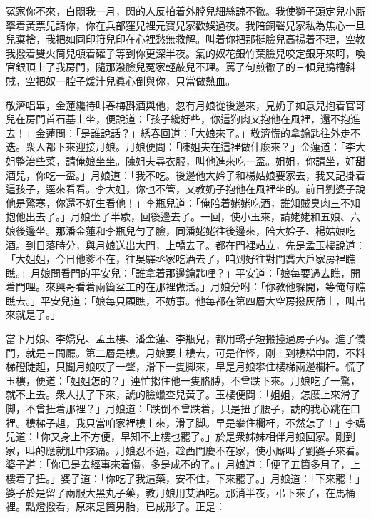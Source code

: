 \begin{myquote} 
冤家你不來，白悶我一月，閃的人反拍着外膛兒細絲諒不徹。我使獅子頭定兒小厮拏着黃票兒請你，你在兵部窪兒裡元寶兒家歡娛過夜。我陪銅磬兒家私為焦心一旦兒棄捨，我把如同印箝兒印在心裡愁無救解。叫着你把那挺臉兒高揚着不理，空教我撥着雙火筒兒頓着礶子等到你更深半夜。氣的奴花銀竹葉臉兒咬定銀牙來呵，喚官銀頂上了我房門，隨那潑臉兒冤家輕敲兒不理。罵了句煎徹了的三傾兒搗槽斜賊，空把奴一腔子煖汁兒眞心倒與你，只當做熱血。
\end{myquote} 

敬濟唱畢，金蓮纔待叫春梅斟酒與他，忽有月娘從後邊來，見奶子如意兒抱着官哥兒在房門首石基上坐，便說道：「孩子纔好些，你這狗肉又抱他在風裡，還不抱進去！」金蓮問：「是誰說話？」綉春回道：「大娘來了。」敬濟慌的拿鑰匙往外走不迭。衆人都下來迎接月娘。月娘便問：「陳姐夫在這裡做什麼來？」金蓮道：「李大姐整治些菜，請俺娘坐坐。{}陳姐夫尋衣服，叫他進來吃一盃。姐姐，你請坐，好甜酒兒，你吃一盃。」月娘道：「我不吃。後邊他大妗子和楊姑娘要家去，我又記掛着這孩子，逕來看看。李大姐，你也不管，又教奶子抱他在風裡坐的。前日劉婆子說他是驚寒，你還不好生看他！」李瓶兒道：「俺陪着姥姥吃酒，誰知賊臭肉三不知抱他出去了。」月娘坐了半歇，回後邊去了。一回，使小玉來，請姥姥和五娘、六娘後邊坐。那潘金蓮和李瓶兒勻了臉，同潘姥姥往後邊來，陪大妗子、楊姑娘吃酒。到日落時分，與月娘送出大門，上轎去了。都在門裡站立，先是孟玉樓說道：「大姐姐，今日他爹不在，往吳驛丞家吃酒去了，咱到好往對門喬大戶家房裡瞧瞧。」月娘問看門的平安兒：「誰拿着那邊鑰匙哩？」平安道：「娘每要過去瞧，開着門哩。來興哥看着兩箇坌工的在那裡做活。」月娘分咐：「你教他躲開，等俺每瞧瞧去。」平安兒道：「娘每只顧瞧，不妨事。他每都在第四層大空房撥灰篩土，叫出來就是了。」

當下月娘、李嬌兒、孟玉樓、潘金蓮、李瓶兒，都用轎子短搬擡過房子內。進了儀門，就是三間廳。第二層是樓。月娘要上樓去，可是作怪，剛上到樓梯中間，不料梯磴陡趄，只聞月娘哎了一聲，滑下一隻脚來，早是月娘攀住樓梯兩邊欄杆。慌了玉樓，便道：「姐姐怎的？」連忙搊住他一隻胳膊，不曾跌下來。月娘吃了一驚，就不上去。衆人扶了下來，諕的臉蠟查兒黃了。玉樓便問：「姐姐，怎麼上來滑了脚，不曾扭着那裡？」月娘道：「跌倒不曾跌着，只是扭了腰子，諕的我心跳在口裡。樓梯子趄，我只當咱家裡樓上來，滑了脚。早是攀住欄杆，不然怎了！」李嬌兒道：「你又身上不方便，早知不上樓也罷了。」於是衆姊妹相伴月娘回家。剛到家，叫的應就肚中疼痛。月娘忍不過，趁西門慶不在家，使小厮叫了劉婆子來看。婆子道：「你已是去經事來着傷，多是成不的了。」月娘道：「便了五箇多月了，上樓着了扭。」婆子道：「你吃了我這藥，安不住，下來罷了。」{}月娘道：「下來罷！」婆子於是留了兩服大黑丸子藥，教月娘用艾酒吃。那消半夜，弔下來了，在馬桶裡。點燈撥看，原來是箇男胎，已成形了。正是：

